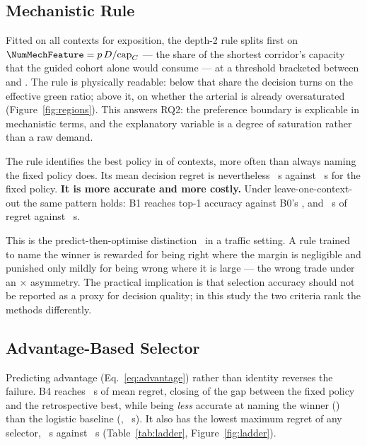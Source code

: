 \subsection{Mechanistic Rule}

Fitted on all contexts for exposition, the depth-2 rule splits first on
$\NumMechFeature = p\,D/\mathrm{cap}_C$ --- the share of the shortest corridor's
capacity that the guided cohort alone would consume --- at a threshold bracketed
between \NumMechBracketLo{} and \NumMechBracketHi{}. The rule is physically
readable: below that share the decision turns on the effective green ratio;
above it, on whether the arterial is already oversaturated
(Figure~\ref{fig:regions}). This answers RQ2: the preference boundary is
explicable in mechanistic terms, and the explanatory variable is a degree of
saturation rather than a raw demand.

The rule identifies the best policy in \NumMechTopOne{} of contexts, more often
than always naming the fixed policy does. Its mean decision regret is
nevertheless \NumMechRegret~s against \NumMechFixedRegret~s for the fixed
policy. \textbf{It is more accurate and more costly.} Under
leave-one-context-out the same pattern holds: B1 reaches \NumBOneTopOne{} top-1
accuracy against B0's \NumBZeroTopOne{}, and \NumBOneRegret~s of regret against
\NumBZeroRegret~s.

This is the predict-then-optimise distinction~\cite{elmachtoub2022spo} in a
traffic setting. A rule trained to name the winner is rewarded for being right
where the margin is negligible and punished only mildly for being wrong where it
is large --- the wrong trade under an \NumAsymRatio$\times$ asymmetry. The
practical implication is that selection accuracy should not be reported as a
proxy for decision quality; in this study the two criteria rank the methods
differently.

\subsection{Advantage-Based Selector}

Predicting advantage (Eq.~\ref{eq:advantage}) rather than identity reverses the
failure. B4 reaches \NumBFourRegret~s of mean regret, closing
\NumBFourGapClosed{} of the gap between the fixed policy and the retrospective
best, while being \emph{less} accurate at naming the winner (\NumBFourTopOne{})
than the logistic baseline (\NumBThreeTopOne{}, \NumBThreeRegret~s). It also has
the lowest maximum regret of any selector, \NumBFourMax~s against
\NumBZeroMax~s (Table~\ref{tab:ladder}, Figure~\ref{fig:ladder}).

